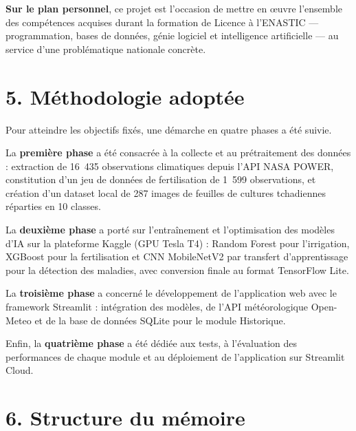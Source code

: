 \medskip

\textbf{Sur le plan personnel}, ce projet est l'occasion de mettre
en \oe uvre l'ensemble des compétences acquises durant la formation
de Licence à l'ENASTIC --- programmation, bases de données, génie
logiciel et intelligence artificielle --- au service d'une
problématique nationale concrète.

\section*{5. Méthodologie adoptée}

Pour atteindre les objectifs fixés, une démarche en quatre phases
a été suivie.

\medskip

La \textbf{première phase} a été consacrée à la collecte et au
prétraitement des données : extraction de 16~435 observations
climatiques depuis l'API NASA POWER, constitution d'un jeu de
données de fertilisation de 1~599 observations, et création d'un
dataset local de 287 images de feuilles de cultures tchadiennes
réparties en 10 classes.

\medskip

La \textbf{deuxième phase} a porté sur l'entraînement et
l'optimisation des modèles d'IA sur la plateforme Kaggle (GPU
Tesla T4) : Random Forest pour l'irrigation, XGBoost pour la
fertilisation et CNN MobileNetV2 par transfert d'apprentissage
pour la détection des maladies, avec conversion finale au format
TensorFlow Lite.

\medskip

La \textbf{troisième phase} a concerné le développement de
l'application web avec le framework Streamlit : intégration des
modèles, de l'API météorologique Open-Meteo et de la base de
données SQLite pour le module Historique.

\medskip

Enfin, la \textbf{quatrième phase} a été dédiée aux tests,
à l'évaluation des performances de chaque module et au déploiement
de l'application sur Streamlit Cloud.

\section*{6. Structure du mémoire}

